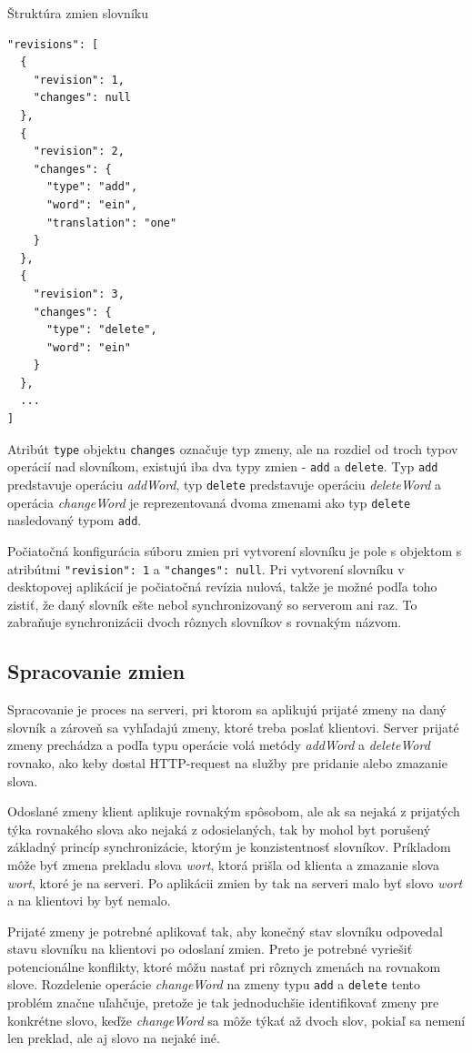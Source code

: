 \documentclass[
  digital, %
  table,   %
  lof,     %
  lot,     %
]{fithesis3}
\begin{document}
\begin{exmp}
\label{exmp:metafile}
Štruktúra zmien slovníku
\centering
\begin{lstlisting}[basicstyle=\small]
"revisions": [
  {
    "revision": 1,
    "changes": null
  },
  {
    "revision": 2,
    "changes": {
      "type": "add",
      "word": "ein",
      "translation": "one"
    }
  },
  {
    "revision": 3,
    "changes": {
      "type": "delete",
      "word": "ein"
    }
  },
  ...
]
\end{lstlisting}
\end{exmp}

Atribút \texttt{type} objektu \texttt{changes} označuje typ zmeny, ale na rozdiel od troch typov operácií nad slovníkom, existujú iba dva typy zmien - \texttt{add} a \texttt{delete}. Typ \texttt{add} predstavuje operáciu \textit{addWord}, typ \texttt{delete} predstavuje operáciu \textit{deleteWord} a operácia \textit{changeWord} je reprezentovaná dvoma zmenami ako typ \texttt{delete} nasledovaný typom \texttt{add}.

Počiatočná konfigurácia súboru zmien pri vytvorení slovníku je pole s objektom s atribútmi \texttt{"revision": 1} a \texttt{"changes": null}. Pri vytvorení slovníku v desktopovej aplikácií je počiatočná revízia nulová, takže je možné podľa toho zistiť, že daný slovník ešte nebol synchronizovaný so serverom ani raz. To zabraňuje synchronizácii dvoch rôznych slovníkov s rovnakým názvom.

\subsection{Spracovanie zmien}
Spracovanie je proces na serveri, pri ktorom sa aplikujú prijaté zmeny na daný slovník a zároveň sa vyhľadajú zmeny, ktoré treba poslať klientovi. Server prijaté zmeny prechádza a podľa typu operácie volá metódy \textit{addWord} a \textit{deleteWord} rovnako, ako keby dostal HTTP-request na služby pre pridanie alebo zmazanie slova.

Odoslané zmeny klient aplikuje rovnakým spôsobom, ale ak sa nejaká z prijatých týka rovnakého slova ako nejaká z odosielaných, tak by mohol byt porušený základný princíp synchronizácie, ktorým je konzistentnosť slovníkov. Príkladom môže byť zmena prekladu slova \textit{wort}, ktorá prišla od klienta a zmazanie slova \textit{wort}, ktoré je na serveri. Po aplikácii zmien by tak na serveri malo byť slovo \textit{wort} a na klientovi by byť nemalo.

Prijaté zmeny je potrebné aplikovať tak, aby konečný stav slovníku odpovedal stavu slovníku na klientovi po odoslaní zmien. Preto je potrebné vyriešiť potencionálne konflikty, ktoré môžu nastať pri rôznych zmenách na rovnakom slove. Rozdelenie operácie \textit{changeWord} na zmeny typu \texttt{add} a \texttt{delete} tento problém značne uľahčuje, pretože je tak jednoduchšie identifikovať zmeny pre konkrétne slovo, keďže \textit{changeWord} sa môže týkať až dvoch slov, pokiaľ sa nemení len preklad, ale aj slovo na nejaké iné.
\end{document}
